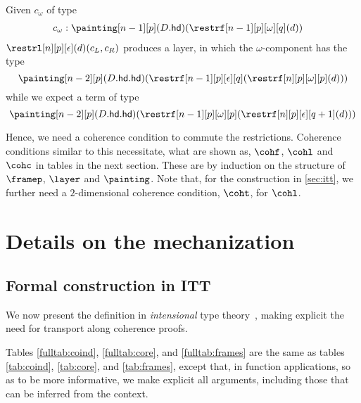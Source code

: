 \documentclass{msc}
\newcommand{\hd}{\ensuremath{\mathsf{hd}}}
\begin{document}
Given $c_\omega$ of type
\begin{align*}
  c_\omega & : \painting[n-1][p](D.\hd)(\restrf[n-1][p][\omega][q](d))
\end{align*}
$\restrl[n][p][\epsilon](d)(c_L, c_R)$ produces a layer, in which the $\omega$-component has the type
\begin{equation*}
  \painting[n-2][p](D.\hd.\hd)(\restrf[n-1][p][\epsilon][q](\restrf[n][p][\omega][p](d)))
\end{equation*}
while we expect a term of type
\begin{equation*}
  \painting[n-2][p](D.\hd.\hd)(\restrf[n-1][p][\omega][p](\restrf[n][p][\epsilon][q+1](d)))
\end{equation*}

Hence, we need a coherence condition to commute the restrictions. Coherence conditions similar to this necessitate, what are shown as, $\cohf$, $\cohl$ and $\cohc$ in tables in the next section. These are by induction on the structure of $\framep$, $\layer$ and $\painting$. Note that, for the construction in \ref{sec:itt}, we further need a $2$-dimensional coherence condition, $\coht$, for $\cohl$.

\section{Details on the mechanization\label{sec:mech}}
\subsection{Formal construction in ITT\label{sec:itt}}

We now present the definition in \emph{intensional} type theory~\cite{martinlof84,coq22}, making explicit the need for transport along coherence proofs.

Tables \ref{fulltab:coind}, \ref{fulltab:core}, and \ref{fulltab:frames} are the same as tables \ref{tab:coind}, \ref{tab:core}, and \ref{tab:frames}, except that, in function applications, so as to be more informative, we make explicit all arguments, including those that can be inferred from the context.
\end{document}
